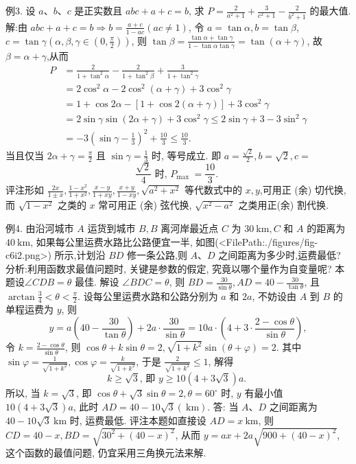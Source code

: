 例3. 设 $a 、 b 、 c$ 是正实数且 $a b c+a+c=b$, 求 $P=\frac{2}{a^2+1}+\frac{3}{c^2+1}- \frac{2}{b^2+1}$ 的最大值.
解:由 $a b c+a+c=b \Rightarrow b=\frac{a+c}{1-a c}(a c \neq 1)$, 令 $a=\tan \alpha, b=\tan \beta$, $c=\tan \gamma\left(\alpha, \beta, \gamma \in\left(0, \frac{\pi}{2}\right)\right)$, 则 $\tan \beta=\frac{\tan \alpha+\tan \gamma}{1-\tan \alpha \tan \gamma}=\tan (\alpha+\gamma)$, 故 $\beta= \alpha+\gamma$,从而
$$
\begin{aligned}
P & =\frac{2}{1+\tan ^2 \alpha}-\frac{2}{1+\tan ^2 \beta}+\frac{3}{1+\tan ^2 \gamma} \\
& =2 \cos ^2 \alpha-2 \cos ^2(\alpha+\gamma)+3 \cos ^2 \gamma \\
& =1+\cos 2 \alpha-[1+\cos 2(\alpha+\gamma)]+3 \cos ^2 \gamma \\
& =2 \sin \gamma \sin (2 \alpha+\gamma)+3 \cos ^2 \gamma \leqslant 2 \sin \gamma+3-3 \sin ^2 \gamma \\
& =-3\left(\sin \gamma-\frac{1}{3}\right)^2+\frac{10}{3} \leqslant \frac{10}{3} .
\end{aligned}
$$
当且仅当 $2 \alpha+\gamma=\frac{\pi}{2}$ 且 $\sin \gamma=\frac{1}{3}$ 时, 等号成立.
即 $a=\frac{\sqrt{2}}{2}, b=\sqrt{2}, c=$
$$
\frac{\sqrt{2}}{4} \text { 时, } P_{\text {max }}=\frac{10}{3} \text {. }
$$
评注形如 $\frac{2 x}{1 \pm x}, \frac{1-x^2}{1+x^2}, \frac{x-y}{1+x y}, \frac{x+y}{1-x y}, \sqrt{a^2+x^2}$ 等代数式中的 $x, y$,可用正 (余) 切代换, 而 $\sqrt{1-x^2}$ 之类的 $x$ 常可用正 (余) 弦代换, $\sqrt{x^2-a^2}$ 之类用正(余) 割代换.



例4. 由沿河城市 $A$ 运货到城市 $B, B$ 离河岸最近点 $C$ 为 $30 \mathrm{~km}, C$ 和 $A$ 的距离为 $40 \mathrm{~km}$, 如果每公里运费水路比公路便宜一半, 如图(<FilePath:./figures/fig-c6i2.png>) 所示,计划沿 $B D$ 修一条公路,则 $A 、 D$ 之间距离为多少时,运费最低?
分析:利用函数求最值问题时, 关键是参数的假定, 究竟以哪个量作为自变量呢? 本题设$\angle C D B=\theta$ 最佳.
解设 $\angle B D C=\theta$, 则 $B D=\frac{30}{\sin \theta}, A D=40-\frac{30}{\tan \theta}$, 且 $\arctan \frac{3}{4}<\theta<\frac{\pi}{2}$.
设每公里运费水路和公路分别为 $a$ 和 $2 a$, 不妨设由 $A$ 到 $B$ 的单程运费为 $y$, 则
$$
y=a\left(40-\frac{30}{\tan \theta}\right)+2 a \cdot \frac{30}{\sin \theta}=10 a \cdot\left(4+3 \cdot \frac{2-\cos \theta}{\sin \theta}\right),
$$
令 $k=\frac{2-\cos \theta}{\sin \theta}$, 则 $\cos \theta+k \sin \theta=2, \sqrt{1+k^2} \sin (\theta+\varphi)=2$.
其中 $\sin \varphi=\frac{1}{\sqrt{1+k^2}}, \cos \varphi=\frac{k}{\sqrt{1+k^2}}$, 于是 $\frac{2}{\sqrt{1+k^2}} \leqslant 1$, 解得
$$
k \geqslant \sqrt{3} \text {, 即 } y \geqslant 10(4+3 \sqrt{3}) a \text {. }
$$
所以, 当 $k=\sqrt{3}$, 即 $\cos \theta+\sqrt{3} \sin \theta=2, \theta=60^{\circ}$ 时, $y$ 有最小值 $10(4+3 \sqrt{3}) a$, 此时 $A D=40-10 \sqrt{3}(\mathrm{~km})$.
答: 当 $A 、 D$ 之间距离为 $40-10 \sqrt{3} \mathrm{~km}$ 时, 运费最低.
评注本题如直接设 $A D=x \mathrm{~km}$, 则 $C D=40-x, B D= \sqrt{30^2+(40-x)^2}$, 从而 $y=a x+2 a \sqrt{900+(40-x)^2}$, 这个函数的最值问题, 仍宜采用三角换元法来解.



